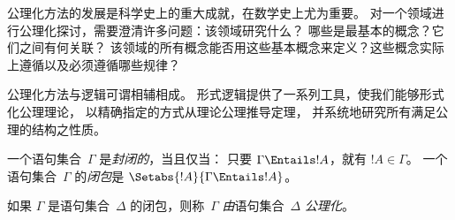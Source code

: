 \documentclass[../../../include/open-logic-section]{subfiles}
\begin{document}

\begin{explain}
公理化方法的发展是科学史上的重大成就，在数学史上尤为重要。
对一个领域进行公理化探讨，需要澄清许多问题：该领域研究什么？
哪些是最基本的概念？它们之间有何关联？
该领域的所有概念能否用这些基本概念来定义？这些概念实际上遵循以及必须遵循哪些规律？

公理化方法与逻辑可谓相辅相成。
形式逻辑提供了一系列工具，使我们能够形式化公理理论，
以精确指定的方式从理论公理推导定理，
并系统地研究所有满足公理的结构之性质。
\end{explain}

\begin{defn}
一个语句集合~$\Gamma$ 是\emph{封闭的}，当且仅当：
只要 $\Gamma \Entails !A$，就有 $!A \in \Gamma$。
一个语句集合~$\Gamma$ 的\emph{闭包}是 $\Setabs{!A}{\Gamma \Entails !A}$。

如果 $\Gamma$ 是语句集合~$\Delta$ 的闭包，则称~$\Gamma$ \emph{由}语句集合~$\Delta$ \emph{公理化}。
\end{defn}
\end{document}

